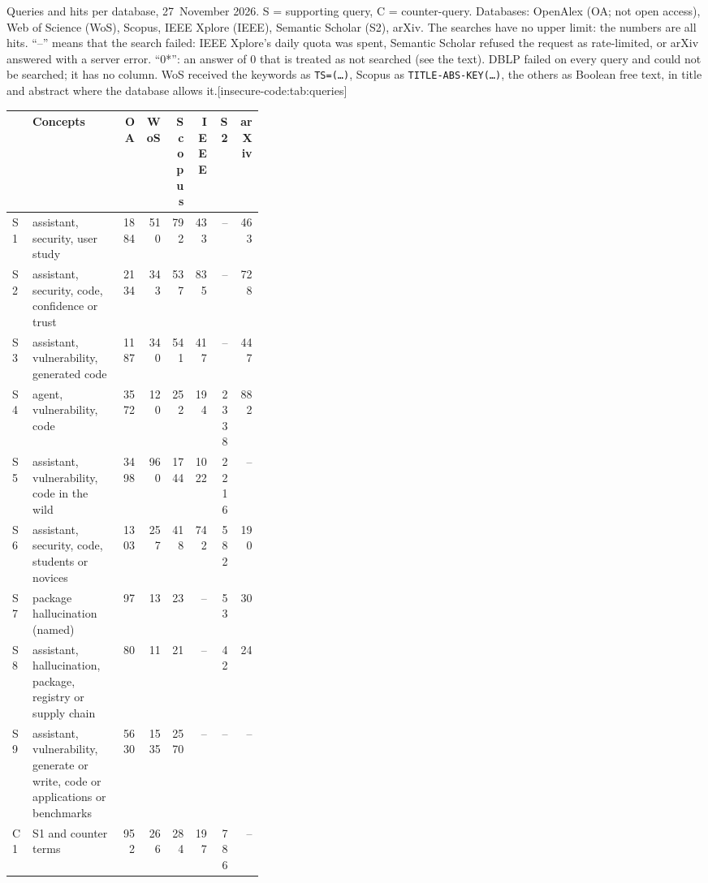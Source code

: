 \begin{table}[tbp]
  \begin{sidecaption}{Queries and hits per database, 27~November 2026.
    S = supporting query, C = counter-query.
    Databases: OpenAlex (OA; not open access), Web of Science (WoS),
    Scopus, IEEE Xplore (IEEE), Semantic Scholar (S2), arXiv.
    The searches have no upper limit: the numbers are all hits.
    \enquote{--} means that the search failed: IEEE Xplore's daily quota was
    spent, Semantic Scholar refused the request as rate-limited, or arXiv
    answered with a server error.
    \enquote{0*}: an answer of 0 that is treated as not searched (see the
    text).
    DBLP failed on every query and could not be searched; it has no column.
    WoS received the keywords as \texttt{TS=(\dots)}, Scopus as
    \texttt{TITLE-ABS-KEY(\dots)}, the others as Boolean free text, in title
    and abstract where the database allows it.}[insecure-code:tab:queries]
    \centering\footnotesize
    \begin{tabular}{@{}lp{0.36\linewidth}rrrrrr@{}}
      \toprule
      & Concepts & OA & WoS & Scopus & IEEE & S2 & arXiv \\
      \midrule
      S1 & assistant, security, user study & 1884 & 510 & 792 & 433 & -- & 463 \\
      S2 & assistant, security, code, confidence or trust & 2134 & 343 & 537 & 835 & -- & 728 \\
      S3 & assistant, vulnerability, generated code & 1187 & 340 & 541 & 417 & -- & 447 \\
      S4 & agent, vulnerability, code & 3572 & 120 & 252 & 194 & 2338 & 882 \\
      S5 & assistant, vulnerability, code in the wild & 3498 & 960 & 1744 & 1022 & 2216 & -- \\
      S6 & assistant, security, code, students or novices & 1303 & 257 & 418 & 742 & 582 & 190 \\
      S7 & package hallucination (named) & 97 & 13 & 23 & -- & 53 & 30 \\
      S8 & assistant, hallucination, package, registry or supply chain & 80 & 11 & 21 & -- & 42 & 24 \\
      S9 & assistant, vulnerability, generate or write, code or applications or benchmarks & 5630 & 1535 & 2570 & -- & -- & -- \\
      \midrule
      C1 & S1 and counter terms & 952 & 266 & 284 & 197 & 786 & -- \\

\end{tabular}
\end{sidecaption}
\end{table}
